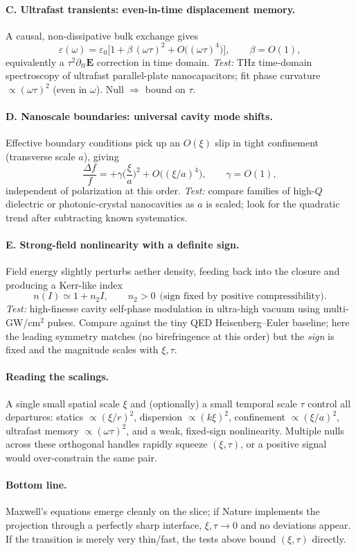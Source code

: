 \paragraph{C. Ultrafast transients: even-in-time displacement memory.}
A causal, non-dissipative bulk exchange gives
\begin{equation}
\varepsilon(\omega)=\varepsilon_0\Big[1+\beta\,(\omega\tau)^2+O\big((\omega\tau)^4\big)\Big],\qquad \beta=O(1),
\end{equation}
equivalently a $\tau^2\partial_{tt}\mathbf E$ correction in time domain.
\emph{Test:} THz time-domain spectroscopy of ultrafast parallel-plate nanocapacitors; fit phase curvature $\propto(\omega\tau)^2$ (even in $\omega$). Null $\Rightarrow$ bound on $\tau$.

\paragraph{D. Nanoscale boundaries: universal cavity mode shifts.}
Effective boundary conditions pick up an $O(\xi)$ slip in tight confinement (transverse scale $a$), giving
\begin{equation}
\frac{\Delta f}{f}=+\gamma\Big(\frac{\xi}{a}\Big)^2 + O\big((\xi/a)^4\big),\qquad \gamma=O(1),
\end{equation}
independent of polarization at this order.
\emph{Test:} compare families of high-$Q$ dielectric or photonic-crystal nanocavities as $a$ is scaled; look for the quadratic trend after subtracting known systematics.

\paragraph{E. Strong-field nonlinearity with a definite sign.}
Field energy slightly perturbs aether density, feeding back into the closure and producing a Kerr-like index
\begin{equation}
n(I)\simeq 1+n_2 I,\qquad n_2>0 \ \ \text{(sign fixed by positive compressibility)}.
\end{equation}
\emph{Test:} high-finesse cavity self-phase modulation in ultra-high vacuum using multi-GW/cm$^2$ pulses. Compare against the tiny QED Heisenberg–Euler baseline; here the leading symmetry matches (no birefringence at this order) but the \emph{sign} is fixed and the magnitude scales with $\xi,\tau$.

\paragraph{Reading the scalings.}
A single small spatial scale $\xi$ and (optionally) a small temporal scale $\tau$ control all departures: statics $\propto(\xi/r)^2$, dispersion $\propto(k\xi)^2$, confinement $\propto(\xi/a)^2$, ultrafast memory $\propto(\omega\tau)^2$, and a weak, fixed-sign nonlinearity. Multiple nulls across these orthogonal handles rapidly squeeze $(\xi,\tau)$, or a positive signal would over-constrain the same pair.

\paragraph{Bottom line.}
Maxwell's equations emerge cleanly on the slice; if Nature implements the projection through a perfectly sharp interface, $\xi,\tau\!\to\!0$ and no deviations appear. If the transition is merely very thin/fast, the tests above bound $(\xi,\tau)$ directly.
